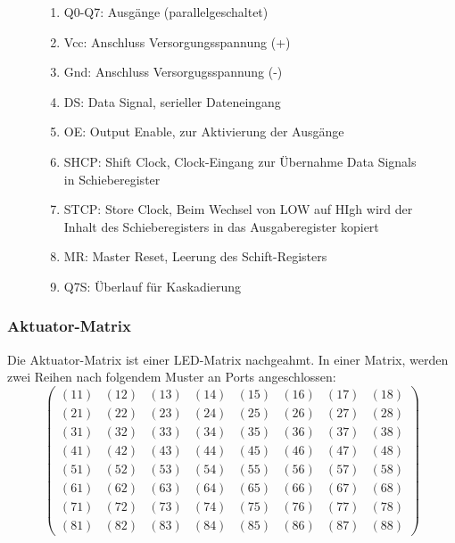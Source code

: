 \begin{figure}[htbp]
\begin{minipage}{0.4\textwidth}
\end{minipage}
\begin{minipage}{0.6\textwidth}
	\begin{enumerate}
		\item Q0-Q7: Ausgänge (parallelgeschaltet)
		\item Vcc: Anschluss Versorgungsspannung (+)
		\item Gnd: Anschluss Versorgugsspannung (-)
		\item DS: Data Signal, serieller Dateneingang
		\item OE: Output Enable, zur Aktivierung der Ausgänge
		\item SHCP: Shift Clock, Clock-Eingang zur Übernahme Data Signals in Schieberegister
		\item STCP: Store Clock, Beim Wechsel von LOW auf HIgh wird der Inhalt des Schieberegisters in das Ausgaberegister kopiert %
		\item MR: Master Reset, Leerung des Schift-Registers
		\item Q7S: Überlauf für Kaskadierung
	\end{enumerate}
\end{minipage}
\end{figure}

\subsubsection{Aktuator-Matrix}
Die Aktuator-Matrix ist einer LED-Matrix nachgeahmt.
In einer Matrix, werden zwei Reihen nach folgendem Muster an Ports angeschlossen:
$$
\begin{pmatrix}
	(11) & (12) & (13) & (14) & (15) & (16) & (17) & (18) \\
	(21) & (22) & (23) & (24) & (25) & (26) & (27) & (28) \\
	(31) & (32) & (33) & (34) & (35) & (36) & (37) & (38) \\
	(41) & (42) & (43) & (44) & (45) & (46) & (47) & (48) \\
	(51) & (52) & (53) & (54) & (55) & (56) & (57) & (58) \\
	(61) & (62) & (63) & (64) & (65) & (66) & (67) & (68) \\
	(71) & (72) & (73) & (74) & (75) & (76) & (77) & (78) \\
	(81) & (82) & (83) & (84) & (85) & (86) & (87) & (88)
\end{pmatrix}
$$


